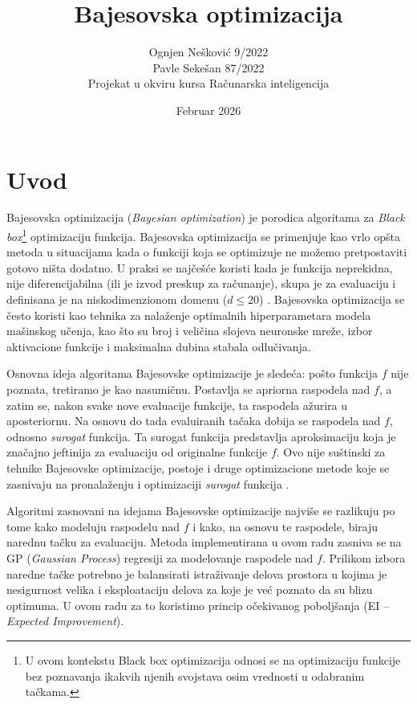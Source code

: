 ﻿\documentclass[11pt,a4paper]{article}
\title{\textbf{Bajesovska optimizacija}}
\author{
Ognjen Nešković 9/2022 \\
Pavle Sekešan 87/2022 \\
\small Projekat u okviru kursa Računarska inteligencija
}
\date{Februar 2026}
\begin{document}
\maketitle
\thispagestyle{empty}
\newpage

\tableofcontents
\newpage

\section{Uvod}
Bajesovska optimizacija (\textit{Bayesian optimization}) je porodica algoritama za \textit{Black box}\footnote{U ovom kontekstu Black box optimizacija odnosi se na optimizaciju funkcije bez poznavanja ikakvih njenih svojstava osim vrednosti u odabranim tačkama.} optimizaciju funkcija.
Bajesovska optimizacija se primenjuje kao vrlo opšta metoda u situacijama kada o funkciji koja se optimizuje ne možemo pretpostaviti gotovo ništa dodatno. U praksi se najčešće koristi kada je funkcija neprekidna, nije diferencijabilna (ili je izvod preskup za računanje), skupa je za evaluaciju i definisana je na niskodimenzionom domenu ($d \leq 20$) \parencite{frazier2018tutorialbayesianoptimization}.
Bajesovska optimizacija se često koristi kao tehnika za nalaženje optimalnih hiperparametara modela mašinskog učenja, kao što su broj i veličina slojeva neuronske mreže, izbor aktivacione funkcije i maksimalna dubina stabala odlučivanja.

Osnovna ideja algoritama Bajesovske optimizacije je sledeća: pošto funkcija $f$ nije poznata, tretiramo je kao nasumičnu. Postavlja se apriorna raspodela nad $f$, a zatim se, nakon svake nove evaluacije funkcije, ta raspodela ažurira u aposteriornu.
Na osnovu do tada evaluiranih tačaka dobija se raspodela nad $f$, odnosno \textit{surogat} funkcija. Ta surogat funkcija predstavlja aproksimaciju koja je značajno jeftinija za evaluaciju od originalne funkcije $f$.
Ovo nije suštinski za tehnike Bajesovske optimizacije, postoje i druge optimizacione metode koje se zasnivaju na pronalaženju i optimizaciji \textit{surogat} funkcija \parencite{booker1999rigorous}.

Algoritmi zasnovani na idejama Bajesovske optimizacije najviše se razlikuju po tome kako modeluju raspodelu nad $f$ i kako, na osnovu te raspodele, biraju narednu tačku za evaluaciju.
Metoda implementirana u ovom radu zasniva se na GP (\textit{Gaussian Process}) regresiji za modelovanje raspodele nad $f$.
Prilikom izbora naredne tačke potrebno je balansirati istraživanje delova prostora u kojima je nesigurnost velika i eksploataciju delova za koje je već poznato da su blizu optimuma. U ovom radu za to koristimo princip očekivanog poboljšanja (EI -- \textit{Expected Improvement}).
\end{document}
